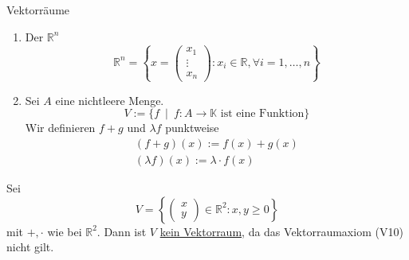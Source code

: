 \begin{example}
    Vektorräume
    \begin{enumerate}
        \item Der $\mathbb{R}^n$
        \[
            \mathbb{R}^n=
            \left\{
            x =
            \begin{pmatrix}
                x_1 \\ \vdots \\ x_n
            \end{pmatrix} :
            x_i\in\mathbb{R}, \forall i = 1, \dots, n
            \right\}
        \]
        \item Sei $A$ eine nichtleere Menge.
        \[
            V := \{ f\ \mid\ f: A\to\mathbb{K} \text{ ist eine Funktion}\}
        \]
        Wir definieren $f+g$ und $\lambda f$ punktweise
        \begin{gather*}
            (f + g) (x) := f(x) + g(x)\\
            (\lambda f)(x) := \lambda \cdot f(x)
        \end{gather*}
    \end{enumerate}
\end{example}
\vspace*{10pt}
\begin{example}
    Sei
    \[
        V = \left\{ \begin{pmatrix}
            x\\y
        \end{pmatrix} \in \mathbb{R}^2 : x,y\geq 0 \right\}    
    \]
    mit $+,\cdot$ wie bei $\mathbb{R}^2$. Dann ist $V$ \underline{kein Vektorraum}, da
    das Vektorraumaxiom (V10) nicht gilt.
\end{example}
\vspace*{10pt}
